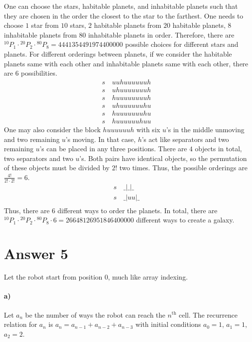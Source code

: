 \documentclass[12pt]{article}
\newcommand{\+}{\mkern2mu}
\newcommand*{\myPerm}[2]{{}^{#1}\!P_{#2}}%
\begin{document}
One can choose the stars, habitable planets, and inhabitable planets such that they are chosen in the order the closest to the star to the farthest. One needs to choose $1$ star from $10$ stars, $2$ habitable planets from $20$ habitable planets, $8$ inhabitable planets from $80$ inhabitable planets in order. Therefore, there are $\myPerm{10}{1} \cdot \myPerm{20}{2} \cdot \myPerm{80}{8} = \num[group-separator={,}]{4441354491974400000}$ possible choices for different stars and planets. For different orderings between planets, if we consider the habitable planets same with each other and inhabitable planets same with each other, there are $6$ possibilities.
\begin{gather*}
    s \quad uuhuuuuuuh \\
    s \quad uhuuuuuuuh \\
    s \quad huuuuuuuuh \\
    s \quad uhuuuuuuhu \\
    s \quad huuuuuuuhu \\
    s \quad huuuuuuhuu
\end{gather*}
One may also consider the block $huuuuuuh$ with six $u$'s in the middle unmoving and two remaining $u$'s moving. In that case, $h$'s act like separators and two remaining $u$'s can be placed in any three positions. There are $4$ objects in total, two separators and two $u$'s. Both pairs have identical objects, so the permutation of these objects must be divided by $2!$ two times. Thus, the possible orderings are $\tfrac{4!}{2! \cdot 2!} = 6$.
\begin{gather*}
    s \quad \_|\_|\_ \\
    s \quad \_|uu|\_ \\
\end{gather*}
Thus, there are $6$ different ways to order the planets. In total, there are $\myPerm{10}{1} \cdot \myPerm{20}{2} \cdot \myPerm{80}{8} \cdot 6 = \num[group-separator={,}]{26648126951846400000}$ different ways to create a galaxy.

\section*{Answer 5}

Let the robot start from position $0$, much like array indexing.
\paragraph{a)}
Let $a_n$ be the number of ways the robot can reach the $n^\text{th}$ cell. The recurrence relation for $a_n$ is $a_n = a_{n-1} + a_{n-2} + a_{n-3}$ with initial conditions $a_0 = 1$, $a_1 = 1$, $a_2 = 2$.
\end{document}
